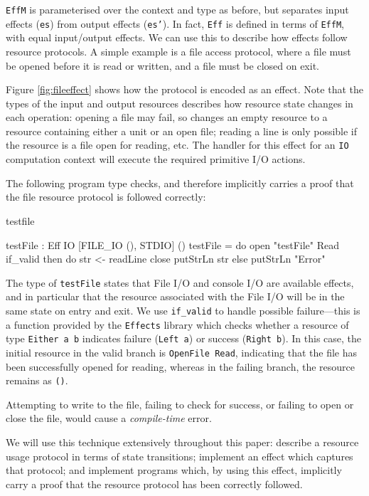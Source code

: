 \noindent
\texttt{EffM} is parameterised over the context and type as before, but
separates input effects (\texttt{es}) from output effects (\texttt{es'}). 
In fact, \texttt{Eff}
is defined in terms of \texttt{EffM}, with equal input/output effects.
We can use this to describe how effects follow resource protocols. A simple
example is a file access protocol, where a file must be opened before it
is read or written, and a file must be closed on exit. 

Figure \ref{fig:fileeffect} shows how the protocol is encoded as an
effect.
Note that the types of the input and output resources describes how resource
state changes in each operation: opening a file may fail, so
changes an empty resource to
a resource containing either a unit or an open file; 
reading a line is only possible if the
resource is a file open for reading, etc.
The handler for this effect for an \texttt{IO} computation context will
execute the required primitive I/O actions.

The following program type checks, and therefore implicitly carries 
a proof that the file resource protocol is followed correctly:

\begin{SaveVerbatim}{testfile}

testFile : Eff IO [FILE_IO (), STDIO] () 
testFile = do open "testFile" Read
              if_valid then do str <- readLine
                            close
                            putStrLn str
                       else putStrLn "Error"

\end{SaveVerbatim}

\noindent
The type of \texttt{testFile} states
that File I/O and console I/O are available effects, and in particular that
the resource associated with the File I/O will be in the same state on entry
and exit. We use \texttt{if\_valid} to handle possible failure---this is
a function provided by the \texttt{Effects} library which checks whether
a resource of type \texttt{Either a b} indicates failure (\texttt{Left a})
or success (\texttt{Right b}). In this case, the initial resource in the valid
branch is \texttt{OpenFile Read}, indicating that the file has been successfully 
opened for reading, whereas in the failing branch, the resource remains as \texttt{()}.

Attempting to write to the file, failing to check for
success, or failing to open or close the
file, would cause a \emph{compile-time} error. 

We will use this technique extensively
throughout this paper: describe a resource usage protocol in terms of
state transitions; implement an effect which captures that protocol; and implement
programs which, by using this effect, implicitly carry a proof that the resource
protocol has been correctly followed.


